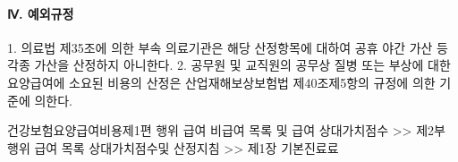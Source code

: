 \paragraph{Ⅳ. 예외규정}
1. 의료법 제35조에 의한 부속 의료기관은 해당 산정항목에 대하여 공휴\cntrdot{} 야간 가산 등 각종 가산을 산정하지 아니한다.
2. 공무원 및 교직원의 공무상 질병 또는 부상에 대한 요양급여에 소요된 비용의 산정은 산업재해보상보험법 제40조제5항의 규정에 의한 기준에 의한다.
  
\begin{mdframed}[linecolor=blue,middlelinewidth=2]
건강보험요양급여비용제1편 행위 급여 \cntrdot{}  비급여 목록 및 급여 상대가치점수 >> 제2부 행위 급여 목록 상대가치점수및  산정지침 >>  제1장 기본진료료
\end{mdframed}  